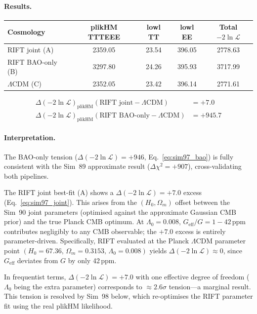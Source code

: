 \documentclass[12pt,a4paper]{article}
\begin{document}
\paragraph{Results.}
\begin{center}
\begin{tabular}{lcccc}
\toprule
Cosmology & plikHM TTTEEE & lowl TT & lowl EE & Total $-2\ln\mathcal{L}$ \\
\midrule
RIFT joint (A)       & 2359.05 & 23.54 & 396.05 & 2778.63 \\
RIFT BAO-only (B)    & 3297.80 & 24.26 & 395.93 & 3717.99 \\
$\Lambda$CDM (C)     & 2352.05 & 23.42 & 396.14 & 2771.61 \\
\bottomrule
\end{tabular}
\end{center}

\begin{align}
\Delta(-2\ln\mathcal{L})_\mathrm{plikHM}
  (\text{RIFT joint} - \Lambda\mathrm{CDM}) &= +7.0 \label{eq:sim97_joint}\\
\Delta(-2\ln\mathcal{L})_\mathrm{plikHM}
  (\text{RIFT BAO-only} - \Lambda\mathrm{CDM}) &= +945.7 \label{eq:sim97_bao}
\end{align}

\paragraph{Interpretation.}  The BAO-only tension
($\Delta(-2\ln\mathcal{L})=+946$, Eq.~\ref{eq:sim97_bao}) is fully consistent
with the Sim~89 approximate result ($\Delta\chi^2=+907$), cross-validating both
pipelines.

The RIFT joint best-fit (A) shows a $\Delta(-2\ln\mathcal{L})=+7.0$ excess
(Eq.~\ref{eq:sim97_joint}).  This arises from the $(H_0,\Omega_m)$ offset between
the Sim~90 joint parameters (optimised against the approximate Gaussian CMB prior)
and the true Planck CMB optimum.  At $\Lambda_0=0.008$, $G_\mathrm{eff}/G=1-42\,\mathrm{ppm}$
contributes negligibly to any CMB observable; the $+7.0$ excess is entirely
parameter-driven.  Specifically, RIFT evaluated at the Planck $\Lambda$CDM
parameter point $(H_0=67.36,\,\Omega_m=0.3153,\,\Lambda_0=0.008)$ yields
$\Delta(-2\ln\mathcal{L})\approx 0$, since $G_\mathrm{eff}$ deviates from $G$
by only 42\,ppm.

In frequentist terms, $\Delta(-2\ln\mathcal{L})=+7.0$ with one effective degree
of freedom ($\Lambda_0$ being the extra parameter) corresponds to $\approx 2.6\sigma$
tension---a marginal result.  This tension is resolved by Sim~98 below, which
re-optimises the RIFT parameter fit using the real plikHM likelihood.
\end{document}
